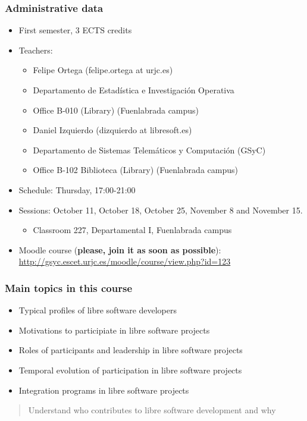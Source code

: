 \documentclass{beamer}
\begin{document}
\begin{frame}
\frametitle{Administrative data}

\begin{itemize}
\item First semester, 3 ECTS credits
\item Teachers:
  \begin{itemize}
  \item Felipe Ortega (felipe.ortega at urjc.es)
  \item Departamento de Estadística e Investigación Operativa
  \item Office B-010 (Library) (Fuenlabrada campus)
  \item Daniel Izquierdo (dizquierdo at libresoft.es)
  \item Departamento de Sistemas Telemáticos y Computación (GSyC)
  \item Office B-102 Biblioteca (Library) (Fuenlabrada campus)
  \end{itemize}
\item Schedule: Thursday, 17:00-21:00
\item Sessions: October 11, October 18, October 25, November 8 and November 15.
  \begin{itemize}
  \item Classroom 227, Departamental I, Fuenlabrada campus
  \end{itemize}
\item Moodle course (\textbf{please, join it as soon as possible}): \\
  \url{http://gsyc.escet.urjc.es/moodle/course/view.php?id=123}
\end{itemize}
\end{frame}


\begin{frame}
\frametitle{Main topics in this course}

\begin{itemize}
\item Typical profiles of libre software developers
\item Motivations to participiate in libre software projects
\item Roles of participants and leadership in libre software projects
\item Temporal evolution of participation in libre software projects
\item Integration programs in libre software projects
\end{itemize}

\begin{quote}
\begin{center}
Understand who contributes to libre software development and why
\end{center}
\end{quote}

\end{frame}
\end{document}
